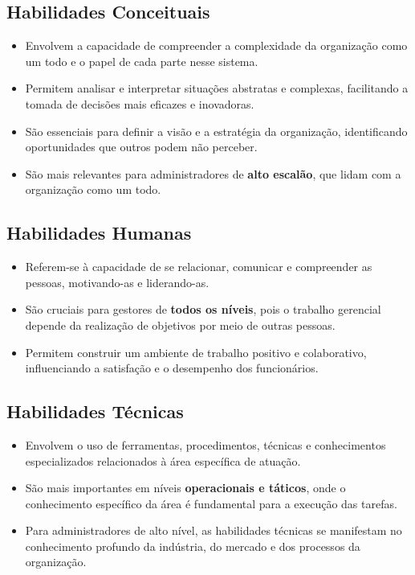 
\subsection{Habilidades Conceituais}
\begin{itemize}
    \item Envolvem a capacidade de compreender a complexidade da organização como um todo e o papel de cada parte nesse sistema.
    \item Permitem analisar e interpretar situações abstratas e complexas, facilitando a tomada de decisões mais eficazes e inovadoras.
    \item São essenciais para definir a visão e a estratégia da organização, identificando oportunidades que outros podem não perceber.
    \item São mais relevantes para administradores de \textbf{alto escalão}, que lidam com a organização como um todo.
\end{itemize}

\subsection{Habilidades Humanas}
\begin{itemize}
    \item Referem-se à capacidade de se relacionar, comunicar e compreender as pessoas, motivando-as e liderando-as.
    \item São cruciais para gestores de \textbf{todos os níveis}, pois o trabalho gerencial depende da realização de objetivos por meio de outras pessoas.
    \item Permitem construir um ambiente de trabalho positivo e colaborativo, influenciando a satisfação e o desempenho dos funcionários.
\end{itemize}

\subsection{Habilidades Técnicas}
\begin{itemize}
    \item Envolvem o uso de ferramentas, procedimentos, técnicas e conhecimentos especializados relacionados à área específica de atuação.
    \item São mais importantes em níveis \textbf{operacionais e táticos}, onde o conhecimento específico da área é fundamental para a execução das tarefas.
    \item Para administradores de alto nível, as habilidades técnicas se manifestam no conhecimento profundo da indústria, do mercado e dos processos da organização.
\end{itemize}



